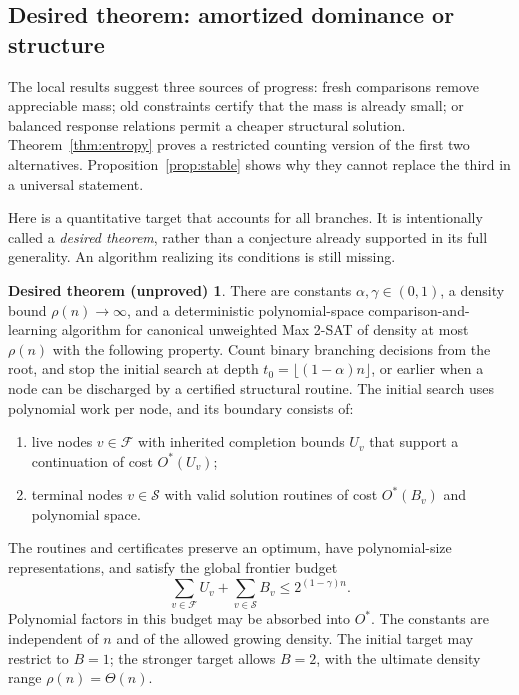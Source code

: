 \documentclass[11pt,a4paper]{article}
\theoremstyle{definition}
\newtheorem*{desiredtheorem}{Desired theorem (unproved)}
\theoremstyle{remark}
\newcommand{\Ostar}{O^{*}}
\begin{document}
\subsection{Desired theorem: amortized dominance or structure}

The local results suggest three sources of progress: fresh comparisons
remove appreciable mass; old constraints certify that the mass is already
small; or balanced response relations permit a cheaper structural
solution. Theorem~\ref{thm:entropy} proves a restricted counting version
of the first two alternatives. Proposition~\ref{prop:stable} shows why
they cannot replace the third in a universal statement.

Here is a quantitative target that accounts for all branches. It is
intentionally called a \emph{desired theorem}, rather than a conjecture
already supported in its full generality. An algorithm realizing its
conditions is still missing.

\begin{desiredtheorem}
There are constants $\alpha,\gamma\in(0,1)$, a density bound
$\rho(n)\to\infty$, and a deterministic polynomial-space comparison-and-learning
algorithm for canonical unweighted Max 2-SAT of density at most $\rho(n)$
with the following property. Count binary branching decisions from the
root, and stop the initial search at depth
$t_0=\lfloor(1-\alpha)n\rfloor$, or earlier when a node can be discharged
by a certified structural routine. The initial search uses polynomial
work per node, and its boundary consists of:
\begin{enumerate}
\item live nodes $v\in\mathcal F$ with inherited completion bounds $U_v$
that support a continuation of cost $\Ostar(U_v)$;
\item terminal nodes $v\in\mathcal S$ with valid solution routines of
cost $\Ostar(B_v)$ and polynomial space.
\end{enumerate}
The routines and certificates preserve an optimum, have polynomial-size
representations, and satisfy the global frontier budget
\begin{equation}
 \sum_{v\in\mathcal F} U_v+\sum_{v\in\mathcal S} B_v
       \le 2^{(1-\gamma)n}.                         \label{eq:desired}
\end{equation}
Polynomial factors in this budget may be absorbed into $\Ostar$.
The constants are independent of $n$ and of the allowed growing density.
The initial target may restrict to $B=1$; the stronger target allows
$B=2$, with the ultimate density range $\rho(n)=\Theta(n)$.
\end{desiredtheorem}
\end{document}
